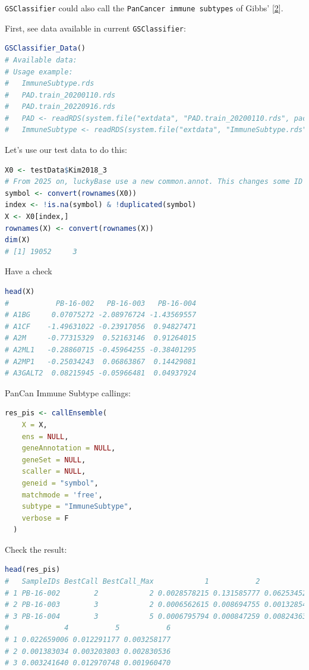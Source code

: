 \documentclass[
  12pt,
]{book}
\newcommand{\passthrough}[1]{#1}
\begin{document}
\passthrough{\lstinline!GSClassifier!} could also call the \passthrough{\lstinline!PanCancer immune subtypes!} of Gibbs' {[}\protect\hyperlink{ref-RN315}{2}{]}.

First, see data available in current \passthrough{\lstinline!GSClassifier!}:

\begin{lstlisting}[language=R]
GSClassifier_Data()
# Available data:
# Usage example:
#   ImmuneSubtype.rds 
#   PAD.train_20200110.rds 
#   PAD.train_20220916.rds 
#   PAD <- readRDS(system.file("extdata", "PAD.train_20200110.rds", package = "GSClassifier")) 
#   ImmuneSubtype <- readRDS(system.file("extdata", "ImmuneSubtype.rds", package = "GSClassifier"))
\end{lstlisting}

Let's use our test data to do this:

\begin{lstlisting}[language=R]
X0 <- testData$Kim2018_3
# From 2025 on, luckyBase use a new common.annot. This changes some ID relationship of genes in PanCan Immune Subtype. Actually, we do not recommend to use SYMBOL ID. Here is just to show how to use an extra model.
symbol <- convert(rownames(X0))
index <- !is.na(symbol) & !duplicated(symbol)
X <- X0[index,]
rownames(X) <- convert(rownames(X))
dim(X)
# [1] 19052     3
\end{lstlisting}

Have a check

\begin{lstlisting}[language=R]
head(X)
#           PB-16-002   PB-16-003   PB-16-004
# A1BG     0.07075272 -2.08976724 -1.43569557
# A1CF    -1.49631022 -0.23917056  0.94827471
# A2M     -0.77315329  0.52163146  0.91264015
# A2ML1   -0.28860715 -0.45964255 -0.38401295
# A2MP1   -0.25034243  0.06863867  0.14429081
# A3GALT2  0.08215945 -0.05966481  0.04937924
\end{lstlisting}

PanCan Immune Subtype callings:

\begin{lstlisting}[language=R]
res_pis <- callEnsemble(
    X = X,
    ens = NULL,
    geneAnnotation = NULL,
    geneSet = NULL,
    scaller = NULL,
    geneid = "symbol",
    matchmode = 'free',
    subtype = "ImmuneSubtype",
    verbose = F
  )
\end{lstlisting}

Check the result:

\begin{lstlisting}[language=R]
head(res_pis)
#   SampleIDs BestCall BestCall_Max            1           2           3
# 1 PB-16-002        2            2 0.0028578215 0.131585777 0.062534529
# 2 PB-16-003        3            2 0.0006562615 0.008694755 0.001328542
# 3 PB-16-004        3            5 0.0006795794 0.000847259 0.008243635
#             4           5           6
# 1 0.022659006 0.012291177 0.003258177
# 2 0.001383034 0.003203803 0.002830536
# 3 0.003241640 0.012970748 0.001960470
\end{lstlisting}
\end{document}
